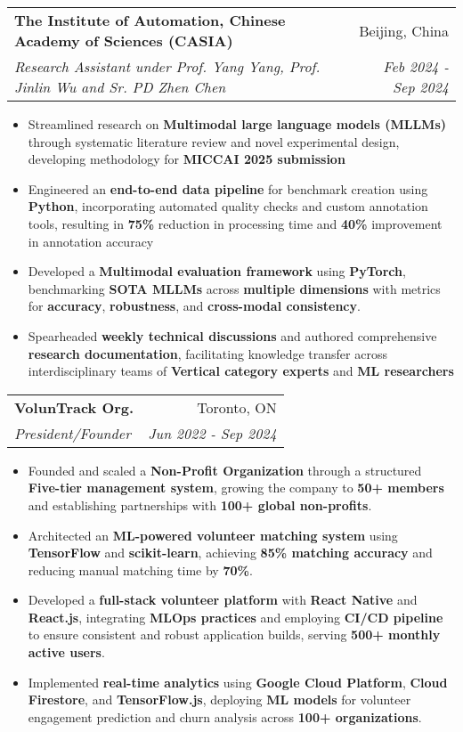 \documentclass[letterpaper,10pt]{article}
\makeatletter
\newcommand{\resumeItem}[1]{
  \item\small{
    {#1 \vspace{-5pt}}
  }
}
\newcommand{\resumeSubheading}[4]{
  \vspace{-2pt}\item
    \begin{tabular*}{0.97\textwidth}[t]{l@{\extracolsep{\fill}}r}
      \textbf{#1} & #2 \\
      \textit{\small#3} & \textit{\small #4} \\
    \end{tabular*}\vspace{-7pt}
}
\newcommand{\resumeItemListStart}{\begin{itemize}}
\newcommand{\resumeItemListEnd}{\end{itemize}\vspace{-5pt}}
\makeatother
\begin{document}
\resumeSubheading
{The Institute of Automation, Chinese Academy of Sciences (CASIA)}{Beijing, China}
{Research Assistant under Prof. Yang Yang, Prof. Jinlin Wu and Sr. PD Zhen Chen}{Feb 2024 - Sep 2024}
\resumeItemListStart
\resumeItem{Streamlined research on \textbf{Multimodal large language models (MLLMs)} through systematic literature review and novel experimental design, developing methodology for \textbf{MICCAI 2025 submission}}
\resumeItem{Engineered an \textbf{end-to-end data pipeline} for benchmark creation using \textbf{Python}, incorporating automated quality checks and custom annotation tools, resulting in \textbf{75\%} reduction in processing time and \textbf{40\%} improvement in annotation accuracy}
\resumeItem{Developed a \textbf{Multimodal evaluation framework} using \textbf{PyTorch}, benchmarking \textbf{SOTA MLLMs} across \textbf{multiple dimensions} with metrics for \textbf{accuracy}, \textbf{robustness}, and \textbf{cross-modal consistency}.}
\resumeItem{Spearheaded \textbf{weekly technical discussions} and authored comprehensive \textbf{research documentation}, facilitating knowledge transfer across interdisciplinary teams of \textbf{Vertical category experts} and \textbf{ML researchers}}
\resumeItemListEnd

\resumeSubheading
{VolunTrack Org.}{Toronto, ON}
{President/Founder}{Jun 2022 - Sep 2024}
\resumeItemListStart
\resumeItem{Founded and scaled a \textbf{Non-Profit Organization} through a structured \textbf{Five-tier management system}, growing the company to \textbf{50+ members} and establishing partnerships with \textbf{100+ global non-profits}.}
\resumeItem{Architected an \textbf{ML-powered volunteer matching system} using \textbf{TensorFlow} and \textbf{scikit-learn}, achieving \textbf{85\% matching accuracy} and reducing manual matching time by \textbf{70\%}.}
\resumeItem{Developed a \textbf{full-stack volunteer platform} with \textbf{React Native} and \textbf{React.js}, integrating \textbf{MLOps practices} and employing \textbf{CI/CD pipeline} to ensure consistent and robust application builds, serving \textbf{500+ monthly active users}.}
\resumeItem{Implemented \textbf{real-time analytics} using \textbf{Google Cloud Platform}, \textbf{Cloud Firestore}, and \textbf{TensorFlow.js}, deploying \textbf{ML models} for volunteer engagement prediction and churn analysis across \textbf{100+ organizations}.}
\resumeItemListEnd
\end{document}
